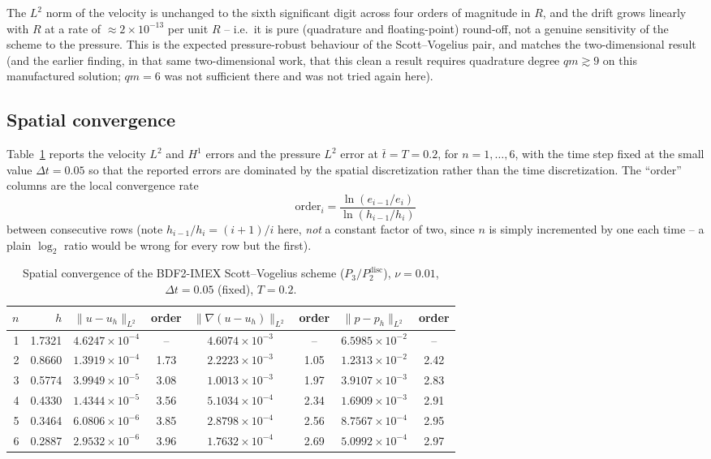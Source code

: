 \documentclass[11pt]{article}
\begin{document}
The $L^2$ norm of the velocity is unchanged to the sixth significant digit across four
orders of magnitude in $R$, and the drift grows linearly with $R$ at a rate of
$\approx2\times10^{-13}$ per unit $R$ -- i.e.\ it is pure (quadrature and floating-point)
round-off, not a genuine sensitivity of the scheme to the pressure. This is the expected
pressure-robust behaviour of the Scott--Vogelius pair, and matches the two-dimensional
result (and the earlier finding, in that same two-dimensional work, that this clean a
result requires quadrature degree $qm\gtrsim9$ on this manufactured solution; $qm=6$ was
not sufficient there and was not tried again here).

\subsection{Spatial convergence}
\label{sec:3d-space}

Table~\ref{tab:3d-space} reports the velocity $L^2$ and $H^1$ errors and the pressure
$L^2$ error at $\bar t=T=0.2$, for $n=1,\dots,6$, with the time step fixed at the small
value $\Delta t=0.05$ so that the reported errors are dominated by the spatial
discretization rather than the time discretization. The ``order'' columns are the local
convergence rate
\[
\text{order}_i=\frac{\ln(e_{i-1}/e_i)}{\ln(h_{i-1}/h_i)}
\]
between consecutive rows (note $h_{i-1}/h_i=(i{+}1)/i$ here, \emph{not} a constant
factor of two, since $n$ is simply incremented by one each time -- a plain $\log_2$ ratio
would be wrong for every row but the first).

\begin{table}[h]\centering
\caption{Spatial convergence of the BDF2-IMEX Scott--Vogelius scheme ($P_3/P_2^{\mathrm{disc}}$),
$\nu=0.01$, $\Delta t=0.05$ (fixed), $T=0.2$.}
\label{tab:3d-space}
\begin{tabular}{rrcccccc}
\toprule
$n$ & $h$ & $\|u-u_h\|_{L^2}$ & order & $\|\nabla(u-u_h)\|_{L^2}$ & order & $\|p-p_h\|_{L^2}$ & order \\
\midrule
1 & 1.7321 & $4.6247\times10^{-4}$ & --   & $4.6074\times10^{-3}$ & --   & $6.5985\times10^{-2}$ & --   \\
2 & 0.8660 & $1.3919\times10^{-4}$ & 1.73 & $2.2223\times10^{-3}$ & 1.05 & $1.2313\times10^{-2}$ & 2.42 \\
3 & 0.5774 & $3.9949\times10^{-5}$ & 3.08 & $1.0013\times10^{-3}$ & 1.97 & $3.9107\times10^{-3}$ & 2.83 \\
4 & 0.4330 & $1.4344\times10^{-5}$ & 3.56 & $5.1034\times10^{-4}$ & 2.34 & $1.6909\times10^{-3}$ & 2.91 \\
5 & 0.3464 & $6.0806\times10^{-6}$ & 3.85 & $2.8798\times10^{-4}$ & 2.56 & $8.7567\times10^{-4}$ & 2.95 \\
6 & 0.2887 & $2.9532\times10^{-6}$ & 3.96 & $1.7632\times10^{-4}$ & 2.69 & $5.0992\times10^{-4}$ & 2.97 \\
\bottomrule
\end{tabular}
\end{table}
\end{document}
